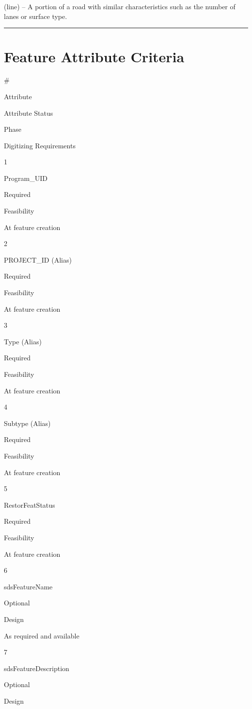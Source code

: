 \documentclass[
  letterpaper,
  DIV=11,
  numbers=noendperiod]{scrreprt}
\begin{document}
(line) -- A portion of a road with similar characteristics such as the
number of lanes or surface type.

\begin{center}\rule{0.5\linewidth}{0.5pt}\end{center}

\section{Feature Attribute
Criteria}\label{feature-attribute-criteria-23}

\#

Attribute

Attribute Status

Phase

Digitizing Requirements

1

Program\_UID

Required

Feasibility

At feature creation

2

PROJECT\_ID (Alias)

Required

Feasibility

At feature creation

3

Type (Alias)

Required

Feasibility

At feature creation

4

Subtype (Alias)

Required

Feasibility

At feature creation

5

RestorFeatStatus

Required

Feasibility

At feature creation

6

sdsFeatureName

Optional

Design

As required and available

7

sdsFeatureDescription

Optional

Design
\end{document}
